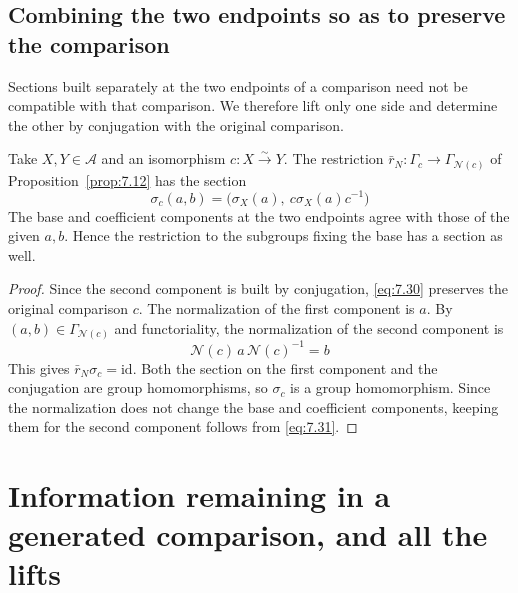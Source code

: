 \subsection*{Combining the two endpoints so as to preserve the comparison}

Sections built separately at the two endpoints of a comparison need not be compatible with
that comparison.
We therefore lift only one side and determine the other by conjugation with the original
comparison.

\begin{theorem}\label{thm:7.19}

Take $X,Y\in\mathcal A$ and an isomorphism $c:X\xrightarrow{\sim}Y$.
The restriction
$\bar r_N:\Gamma_c\to\Gamma_{\mathcal N(c)}$ of Proposition~\ref{prop:7.12} has the section
\begin{equation*}
\sigma_c(a,b)=\bigl(\sigma_X(a),\ c\sigma_X(a)c^{-1}\bigr)
\tag{7.30}\label{eq:7.30}
\end{equation*}
The base and coefficient components at the two endpoints agree with those of the given
$a,b$.
Hence the restriction to the subgroups fixing the base has a section as well.

\end{theorem}

\begin{proof}

Since the second component is built by conjugation, \eqref{eq:7.30} preserves the original
comparison $c$.
The normalization of the first component is $a$.
By $(a,b)\in\Gamma_{\mathcal N(c)}$ and functoriality, the normalization of the second
component is
\begin{equation*}
\mathcal N(c)\,a\,\mathcal N(c)^{-1}=b
\tag{7.31}\label{eq:7.31}
\end{equation*}
This gives $\bar r_N\sigma_c=\mathrm{id}$.
Both the section on the first component and the conjugation are group homomorphisms, so
$\sigma_c$ is a group homomorphism.
Since the normalization does not change the base and coefficient components, keeping them
for the second component follows from \eqref{eq:7.31}.

\end{proof}

\section{Information remaining in a generated comparison, and all the lifts}\label{sec:7.6}

